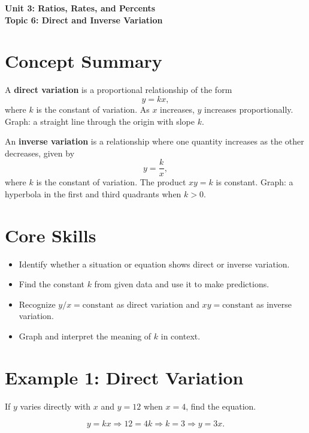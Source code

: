 \documentclass[14pt]{extarticle}
\begin{document}
\raggedright
{}

\begin{center}
    \LARGE \textbf{Unit 3: Ratios, Rates, and Percents} \\[6pt]
    \Large \textbf{Topic 6: Direct and Inverse Variation}
\end{center}

\vspace{1em}

\section*{Concept Summary}

A \textbf{direct variation} is a proportional relationship of the form
\[
y = kx,
\]
where \(k\) is the constant of variation. As \(x\) increases, \(y\) increases proportionally.  
Graph: a straight line through the origin with slope \(k\).

An \textbf{inverse variation} is a relationship where one quantity increases as the other decreases, given by
\[
y = \frac{k}{x},
\]
where \(k\) is the constant of variation. The product \(xy = k\) is constant.  
Graph: a hyperbola in the first and third quadrants when \(k > 0\).

\section*{Core Skills}
\begin{itemize}
  \item Identify whether a situation or equation shows direct or inverse variation.
  \item Find the constant \(k\) from given data and use it to make predictions.
  \item Recognize \(y/x = \text{constant}\) as direct variation and \(xy = \text{constant}\) as inverse variation.
  \item Graph and interpret the meaning of \(k\) in context.
\end{itemize}

\section*{Example 1: Direct Variation}

If \(y\) varies directly with \(x\) and \(y=12\) when \(x=4\), find the equation.

\[
y = kx \Rightarrow 12 = 4k \Rightarrow k = 3 \Rightarrow \boxed{y = 3x}.
\]
\end{document}
